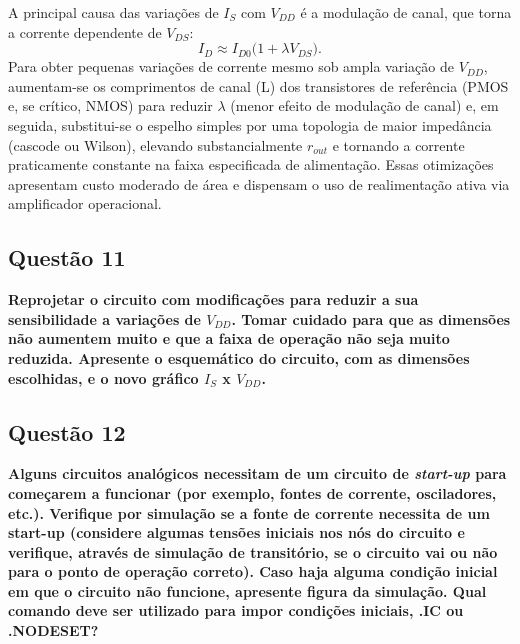 ﻿\documentclass[12pt,a4paper]{article}
\begin{document}
A principal causa das variações de $I_S$ com $V_{DD}$ é a modulação de canal, que torna a corrente dependente de $V_{DS}$: \begin{equation} I_D \approx I_{D0}\big(1 + \lambda V_{DS}\big). \end{equation} 
Para obter pequenas variações de corrente mesmo sob ampla variação de $V_{DD}$, aumentam-se os comprimentos de canal (L) dos transistores de referência (PMOS e, se crítico, NMOS) para reduzir $\lambda$ (menor efeito de modulação de canal) e, em seguida, substitui-se o espelho simples por uma topologia de maior impedância (cascode ou Wilson), elevando substancialmente $r_{out}$ e tornando a corrente praticamente constante na faixa especificada de alimentação. Essas otimizações apresentam custo moderado de área e dispensam o uso de realimentação ativa via amplificador operacional.

\newpage

\subsection*{Questão 11}
\begin{BoxQ}
	\textbf{Reprojetar o circuito com modificações para reduzir a sua sensibilidade a variações de $V_{DD}$. Tomar cuidado para que as dimensões não aumentem muito e que a faixa de operação não seja muito reduzida. Apresente o esquemático do circuito, com as dimensões escolhidas, e o novo gráfico $I_S$ x $V_{DD}$.}
\end{BoxQ}

\subsection*{Questão 12}
\begin{BoxQ}
	\textbf{Alguns circuitos analógicos necessitam de um circuito de \emph{start-up} para começarem a funcionar (por exemplo, fontes de corrente, osciladores, etc.). Verifique por simulação se a fonte de corrente necessita de um start-up (considere algumas tensões iniciais nos nós do circuito e verifique, através de simulação de transitório, se o circuito vai ou não para o ponto de operação correto). Caso haja alguma condição inicial em que o circuito não funcione, apresente figura da simulação. Qual comando deve ser utilizado para impor condições iniciais, .IC ou .NODESET?}
\end{BoxQ}
\end{document}
